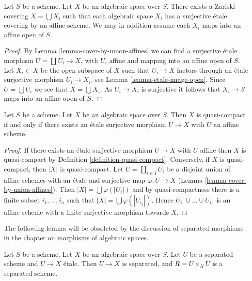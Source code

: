 \begin{lemma}
\label{lemma-union-of-quasi-compact}
Let $S$ be a scheme.
Let $X$ be an algebraic space over $S$.
There exists a Zariski covering $X = \bigcup X_i$
such that each algebraic space $X_i$ has a surjective
\'etale covering by an affine scheme. We may in addition assume
each $X_i$ maps into an affine open of $S$.
\end{lemma}

\begin{proof}
By Lemma \ref{lemma-cover-by-union-affines} we can find a surjective
\'etale morphism $U = \coprod U_i \to X$, with $U_i$ affine and mapping
into an affine open of $S$. Let $X_i \subset X$ be the open subspace
of $X$ such that $U_i \to X$ factors through an \'etale surjective morphism
$U_i \to X_i$, see
Lemma \ref{lemma-etale-image-open}.
Since $U = \bigcup U_i$ we see that $X = \bigcup X_i$.
As $U_i \to X_i$ is surjective it follows that $X_i \to S$ maps into
an affine open of $S$.
\end{proof}

\begin{lemma}
\label{lemma-quasi-compact-affine-cover}
Let $S$ be a scheme.
Let $X$ be an algebraic space over $S$.
Then $X$ is quasi-compact if and only if
there exists an \'etale surjective morphism $U \to X$
with $U$ an affine scheme.
\end{lemma}

\begin{proof}
If there exists an \'etale surjective morphism $U \to X$ with $U$
affine then $X$ is quasi-compact by Definition \ref{definition-quasi-compact}.
Conversely, if $X$ is quasi-compact, then $|X|$ is quasi-compact.
Let $U = \coprod_{i \in I} U_i$ be a disjoint union of affine schemes
with an \'etale and surjective map $\varphi : U \to X$
(Lemma \ref{lemma-cover-by-union-affines}).
Then $|X| = \bigcup \varphi(|U_i|)$ and
by quasi-compactness there is a finite subset $i_1, \ldots, i_n$
such that $|X| = \bigcup \varphi(|U_{i_j}|)$. Hence
$U_{i_1} \cup \ldots \cup U_{i_n}$ is an affine scheme with a
finite surjective morphism towards $X$.
\end{proof}

\noindent
The following lemma will be obsoleted by the discussion of
separated morphisms in the chapter on morphisms of algebraic spaces.

\begin{lemma}
\label{lemma-separated-cover}
Let $S$ be a scheme.
Let $X$ be an algebraic space over $S$.
Let $U$ be a separated scheme and $U \to X$ \'etale.
Then $U \to X$ is separated, and $R = U \times_X U$ is a separated scheme.
\end{lemma}

